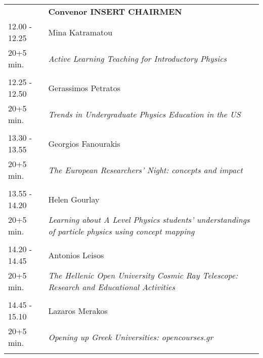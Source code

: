 \begin{longtable}{p{3cm}p{13cm}}
&\hfill {\bf Convenor INSERT CHAIRMEN }\\ 
12.00 - 12.25 & Mina Katramatou\\ 
20+5 min. & {\it Active Learning Teaching for Introductory Physics}\\ 
 & \\ 
12.25 - 12.50 & Gerassimos Petratos\\ 
20+5 min. & {\it Trends in Undergraduate Physics Education in the US}\\ 
 & \\ 
13.30 - 13.55 & Georgios Fanourakis\\ 
20+5 min. & {\it The European Researchers' Night: concepts and impact}\\ 
 & \\ 
13.55 - 14.20 & Helen Gourlay\\ 
20+5 min. & {\it Learning about A Level Physics students’ understandings of particle physics using concept mapping}\\ 
 & \\ 
14.20 - 14.45 & Antonios Leisos\\ 
20+5 min. & {\it The Hellenic Open University Cosmic Ray Telescope: Research and Educational Activities}\\ 
 & \\ 
14.45 - 15.10 & Lazaros Merakos\\ 
20+5 min. & {\it Opening up Greek Universities: opencourses.gr}\\ 
 & \\ 
\end{longtable}

